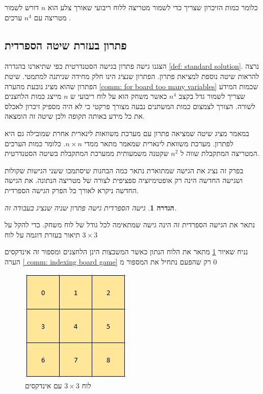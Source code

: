 \documentclass[12pt,twoside]{article}
\newtheorem{definition}{הגדרה}[section]
\begin{document}
כלומר כמות הזיכרון שצריך כדי לשמור מטריצה ללוח ריבועי שאורך צלע הוא
$n$
דורש לשמור מטריצה עם 
$n^4$
ערכים
.

\subsection{פתרון בעזרת שיטה הספרדית}
הצגנו גישה פתרון
בגישה הסטנדרטית 
כפי שתיארנו
בהגדרה
\ref{def: standard solution}.
נרצה להראות שיטה נוספת למציאת פתרון.
הפתרון שנציג הינו חלק מחידה שניתנה למתמטי.
שיטת הפתרון שהוא מציג נובעת מהערה 
\ref{comm: for board too many variables}
שכמות המידע שצריך לשמור גדל בקצב 
$n^4$
כאשר
משחק הוא על לוח ריבועי ש
$n$
מייצג
כמות הלחצנים לשורה.
הצורך לצמצום כמות המשתנים נבעה מצורך פרקטי כי לא היה מספיק זיכרון לאכלס את כל מידע 
באותה תקופה ולכן שיטה זה הומצאה.

במאמר 
\cite{B1}
מציג שיטה שמציאה פתרון עם מערכת משוואות לינארית אחרת שמובילה גם היא לפתרון.
מערכת משוואת לינארית שמאמר 
\cite{B1}
מתאר ממדי
$n \times n $.
כלומר כמות הערכים המטריצה המתקבלת שווה
ל
$n^2$
שקטנה משמעותית 
ממערכת המתקבלת בשיטה הסטנדרטית.

בפרק זה נציג את הגישה שמתוארת 
\cite{B1}
נתאר כמה הבחנות שיסתמכו ששני הגישות שקולות ושגישה החדשה הינה רק אופטימיזציה
ספציפית לצורה של מטריצה הנתונה.
את הגישה החדשה ניקרא לאורך כל הפרק הגישה הספרדית.

\begin{definition}
    \label{def: spanish way}
    גישה הספרדית גישה פתרון שניה שנציג בעבודה זה.
\end{definition}

נתאר את הגישה הספרדית 
זה הינה גישה שמתאימה לכל גודל של לוח משחק.
כדי להקל על תיאור 
בעזרת דוגמה על לוח 
$3 \times 3$

נניח שאיור 
\ref{fig: 3 x 3 board indexed}
מתאר את הלוח הנתון כאשר המשבצות הינן הלחצנים ומספור זה אינדקסים הערה 
\ref{ comm: indexing board game}
רק שהפעם נתחיל את המספור מ
$0$

\begin{figure}[ht]
    \caption{לוח 
    $3 \times 3$
    עם אינדקסים}
    \label{fig: 3 x 3 board indexed}
    \unsethebrew
    \centering
    \includegraphics[width=.3\textwidth,height=.3\textheight,keepaspectratio]{images/3x3_board_index.PNG}
\end{figure}
\sethebrew
\end{document}
